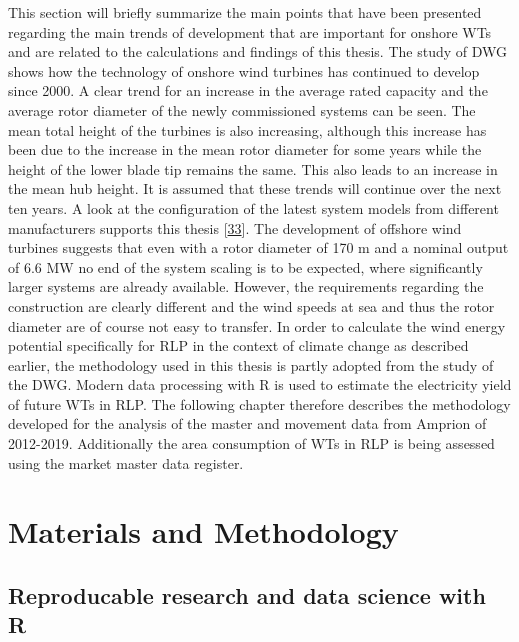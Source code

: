 \documentclass[a4paper,11pt]{article}
\begin{document}
This section will briefly summarize the main points that have been presented regarding the main trends of development that are important for onshore WTs and are related to the calculations and findings of this thesis. The study of DWG shows how the technology of onshore wind turbines has continued to develop since 2000. A clear trend for an increase in the average rated capacity and the average rotor diameter of the newly commissioned systems can be seen. The mean total height of the turbines is also increasing, although this increase has been due to the increase in the mean rotor diameter for some years while the height of the lower blade tip remains the same. This also leads to an increase in the mean hub height. It is assumed that these trends will continue over the next ten years. A look at the configuration of the latest system models from different manufacturers supports this thesis {[}\protect\hyperlink{ref-VestasWindSystemsAS.2019}{33}{]}. The development of offshore wind turbines suggests that even with a rotor diameter of 170 m and a nominal output of 6.6 MW no end of the system scaling is to be expected, where significantly larger systems are already available. However, the requirements regarding the construction are clearly different and the wind speeds at sea and thus the rotor diameter are of course not easy to transfer. In order to calculate the wind energy potential specifically for RLP in the context of climate change as described earlier, the methodology used in this thesis is partly adopted from the study of the DWG. Modern data processing with R is used to estimate the electricity yield of future WTs in RLP. The following chapter therefore describes the methodology developed for the analysis of the master and movement data from Amprion of 2012-2019. Additionally the area consumption of WTs in RLP is being assessed using the market master data register.

\newpage

\hypertarget{materials-and-methodology}{%
\section{Materials and Methodology}\label{materials-and-methodology}}

\hypertarget{reproducable-research-and-data-science-with-r}{%
\subsection{Reproducable research and data science with R}\label{reproducable-research-and-data-science-with-r}}
\end{document}
